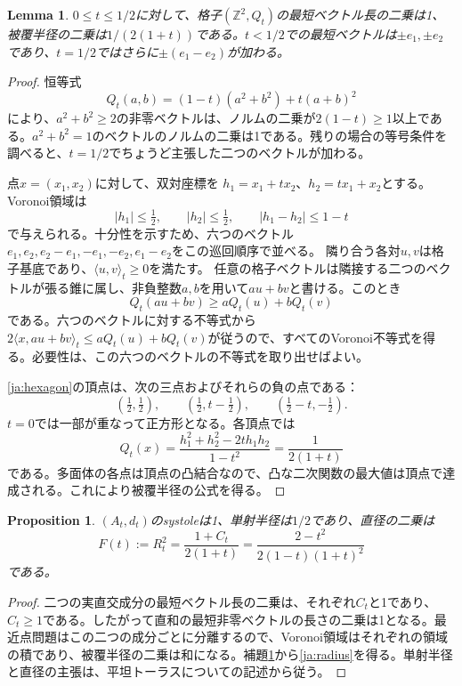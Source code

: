 \documentclass[12pt]{amsart}
\newcommand{\PropositionName}{Proposition}
\newcommand{\LemmaName}{Lemma}
\newtheorem{prop}[thm]{\PropositionName}
\newtheorem{lem}[thm]{\LemmaName}
\theoremstyle{definition}
\theoremstyle{remark}
\numberwithin{equation}{section}
\newcommand{\Z}{\mathbb{Z}}
\begin{document}
\begin{lem}\label{ja:rhombus}
$0\leq t\leq1/2$に対して、格子$(\Z^2,Q_t)$の最短ベクトル長の二乗は1、被覆半径の二乗は$1/(2(1+t))$である。$t<1/2$での最短ベクトルは$\pm e_1,\pm e_2$であり、$t=1/2$ではさらに$\pm(e_1-e_2)$が加わる。
\end{lem}
\begin{proof}
恒等式
\[
Q_t(a,b)=(1-t)(a^2+b^2)+t(a+b)^2
\]
により、$a^2+b^2\geq2$の非零ベクトルは、ノルムの二乗が$2(1-t)\geq1$以上である。$a^2+b^2=1$のベクトルのノルムの二乗は1である。残りの場合の等号条件を調べると、$t=1/2$でちょうど主張した二つのベクトルが加わる。

点$x=(x_1,x_2)$に対して、双対座標を
$h_1=x_1+tx_2$、$h_2=tx_1+x_2$とする。
Voronoi領域は
\begin{equation}\label{ja:hexagon}
|h_1|\leq\tfrac12,\qquad |h_2|\leq\tfrac12,
\qquad |h_1-h_2|\leq1-t
\end{equation}
で与えられる。十分性を示すため、六つのベクトル
$e_1,e_2,e_2-e_1,-e_1,-e_2,e_1-e_2$をこの巡回順序で並べる。
隣り合う各対$u,v$は格子基底であり、$\langle u,v\rangle_t\geq0$を満たす。
任意の格子ベクトルは隣接する二つのベクトルが張る錐に属し、非負整数$a,b$を用いて$au+bv$と書ける。このとき
\[
Q_t(au+bv)\geq aQ_t(u)+bQ_t(v)
\]
である。六つのベクトルに対する不等式から
$2\langle x,au+bv\rangle_t\leq aQ_t(u)+bQ_t(v)$が従うので、すべてのVoronoi不等式を得る。必要性は、この六つのベクトルの不等式を取り出せばよい。

\eqref{ja:hexagon}の頂点は、次の三点およびそれらの負の点である：
\[
(\tfrac12,\tfrac12),\qquad
(\tfrac12,t-\tfrac12),\qquad
(\tfrac12-t,-\tfrac12).
\]
$t=0$では一部が重なって正方形となる。各頂点では
\[
Q_t(x)=\frac{h_1^2+h_2^2-2th_1h_2}{1-t^2}
=\frac1{2(1+t)}
\]
である。多面体の各点は頂点の凸結合なので、凸な二次関数の最大値は頂点で達成される。これにより被覆半径の公式を得る。
\end{proof}

\begin{prop}\label{ja:radii}
$(A_t,d_t)$のsystoleは1、単射半径は$1/2$であり、直径の二乗は
\begin{equation}\label{ja:radius}
F(t):=R_t^2=\frac{1+C_t}{2(1+t)}
=\frac{2-t^2}{2(1-t)(1+t)^2}
\end{equation}
である。
\end{prop}
\begin{proof}
二つの実直交成分の最短ベクトル長の二乗は、それぞれ$C_t$と1であり、$C_t\geq1$である。したがって直和の最短非零ベクトルの長さの二乗は1となる。最近点問題はこの二つの成分ごとに分離するので、Voronoi領域はそれぞれの領域の積であり、被覆半径の二乗は和になる。補題\ref{ja:rhombus}から\eqref{ja:radius}を得る。単射半径と直径の主張は、平坦トーラスについての記述から従う。
\end{proof}
\end{document}
